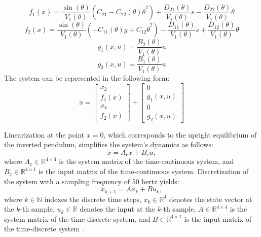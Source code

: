 \begin{equation}
    f_{\mathrm{1}}(x) = \frac{\sin(\theta)}{V_{\mathrm{1}}(\theta)} \left( C_{\mathrm{21}} - C_{\mathrm{22}}(\theta)\dot{\theta}^2 \right) + \frac{D_{\mathrm{21}}(\theta)}{V_{\mathrm{1}}(\theta)}\dot{s} - \frac{D_{\mathrm{22}}(\theta)}{V_{\mathrm{1}}(\theta)}\dot{\theta}
\end{equation}
\begin{equation}
    f_{\mathrm{2}}(x) = \frac{\sin(\theta)}{V_{\mathrm{1}}(\theta)} \left( -C_{\mathrm{11}}(\theta)g + C_{\mathrm{12}}\dot{\theta}^2 \right) - \frac{D_{\mathrm{11}}(\theta)}{V_{\mathrm{1}}(\theta)}\dot{s} + \frac{D_{\mathrm{12}}(\theta)}{V_{\mathrm{1}}(\theta)}\dot{\theta}
\end{equation}
\begin{equation}
    g_{\mathrm{1}}(x,u) = \frac{B_{\mathrm{2}}(\theta)}{V_{\mathrm{1}}(\theta)}u
\end{equation}
\begin{equation}
    g_{\mathrm{2}}(x,u) = \frac{B_{\mathrm{1}}(\theta)}{V_{\mathrm{1}}(\theta)}u
\end{equation}
The system can be represented in the following form:
\begin{equation}
    \dot{x} = \begin{bmatrix}
        x_{\mathrm{2}} \\
        f_{\mathrm{1}}(x) \\
        x_{\mathrm{4}}    \\
        f_{\mathrm{2}}(x)
    \end{bmatrix} + \begin{bmatrix}
        0 \\
        g_{\mathrm{1}}(x,u) \\
        0 \\
        g_{\mathrm{2}}(x,u)
    \end{bmatrix}
\end{equation}

Linearization at the point $x = 0$, which corresponds to the upright equilibrium of the inverted pendulum, simplifies the system's dynamics as follows:
\begin{equation}
    \dot{x} = A_{\mathrm{c}}x + B_{\mathrm{c}}u,
\end{equation}
where $A_{\mathrm{c}} \in \mathbb{R}^{4\times4}$ is the system matrix of the time-continuous system, and $B_{\mathrm{c}} \in \mathbb{R}^{4\times1}$ is the input matrix of the time-continuous system. Discretization of the system with a sampling frequency of 50 hertz yields:
\begin{equation}
    x_{k+1} = A x_k + B u_k,
\end{equation}
where $k \in \mathbb{N}$ indexes the discrete time steps, $x_k \in \mathbb{R}^4$ denotes the state vector at the $k$-th sample, $u_k \in \mathbb{R}$ denotes the input at the $k$-th sample, $A \in \mathbb{R}^{4\times4}$ is the system matrix of the time-discrete system, and $B \in \mathbb{R}^{4\times1}$ is the input matrix of the time-discrete system \cite{MastersThesis}.




